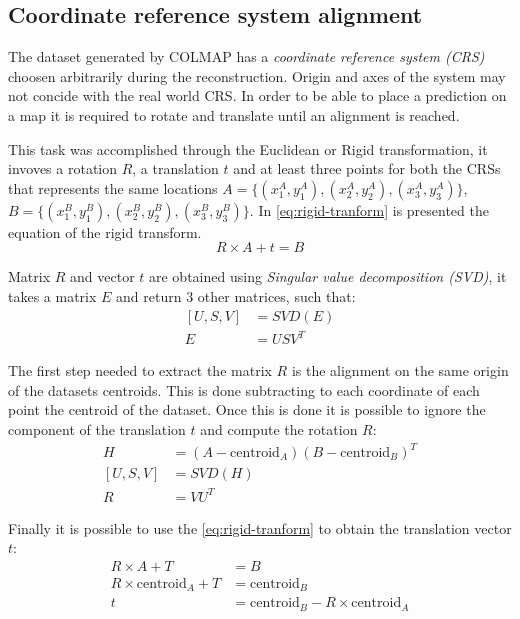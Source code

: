 \subsection{Coordinate reference system alignment}
The dataset generated by COLMAP has a \textit{coordinate reference system (CRS)} choosen arbitrarily during the reconstruction. Origin and axes of the system may not concide with the real world CRS. In order to be able to place a prediction on a map it is required to rotate and translate until an alignment is reached.

This task was accomplished through the Euclidean or Rigid transformation, it invoves a rotation $R$, a translation $t$ and at least three points for both the CRSs that represents the same locations $A=\{(x_1^A, y_1^A), (x_2^A, y_2^A), (x_3^A, y_3^A)\}$, $B=\{(x_1^B, y_1^B), (x_2^B, y_2^B), (x_3^B, y_3^B)\}$. In \cref{eq:rigid-tranform} is presented the equation of the rigid transform.
\begin{equation}
    R\times A+t = B
    \label{eq:rigid-tranform}
\end{equation}

Matrix $R$ and vector $t$ are obtained using \textit{Singular value decomposition (SVD)}, it takes a matrix $E$ and return 3 other matrices, such that: 
\begin{equation}
    \begin{aligned}
        [U, S, V] &= SVD(E)\\
        E &= USV^T
    \end{aligned}
    \label{eq:singular-value-decomposition}
\end{equation}

The first step needed to extract the matrix $R$ is the alignment on the same origin of the datasets centroids. This is done subtracting to each coordinate of each point the centroid of the dataset. Once this is done it is possible to ignore the component of the translation $t$ and compute the rotation $R$:
\begin{equation}
    \begin{aligned}
        H &=(A-\text{centroid}_A)(B-\text{centroid}_B)^T\\
        [U, S, V] &= SVD(H)\\
        R &=VU^T
    \end{aligned}
    \label{eq:rotation-matrix}
\end{equation}

Finally it is possible to use the \cref{eq:rigid-tranform} to obtain the translation vector $t$:
\begin{equation}
    \begin{aligned}
        R\times A + T &= B\\
        R\times \text{centroid}_A + T &= \text{centroid}_B\\
        t &= \text{centroid}_B - R\times \text{centroid}_A
    \end{aligned}
    \label{eq:translation-vector}
\end{equation}
